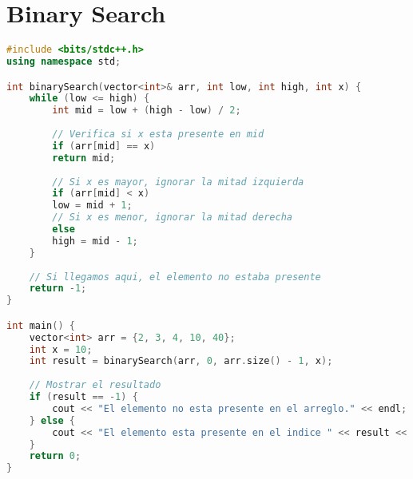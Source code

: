 
\section*{Binary Search}

\begin{lstlisting}[language=C++]
#include <bits/stdc++.h>
using namespace std;

int binarySearch(vector<int>& arr, int low, int high, int x) {
	while (low <= high) {
		int mid = low + (high - low) / 2;
		
		// Verifica si x esta presente en mid
		if (arr[mid] == x)
		return mid;
		
		// Si x es mayor, ignorar la mitad izquierda
		if (arr[mid] < x)
		low = mid + 1;
		// Si x es menor, ignorar la mitad derecha
		else
		high = mid - 1;
	}
	
	// Si llegamos aqui, el elemento no estaba presente
	return -1;
}

int main() {
	vector<int> arr = {2, 3, 4, 10, 40};
	int x = 10;
	int result = binarySearch(arr, 0, arr.size() - 1, x);
	
	// Mostrar el resultado
	if (result == -1) {
		cout << "El elemento no esta presente en el arreglo." << endl;
	} else {
		cout << "El elemento esta presente en el indice " << result << "." << endl; // 0 indezado
	}
	return 0;
}
\end{lstlisting}
